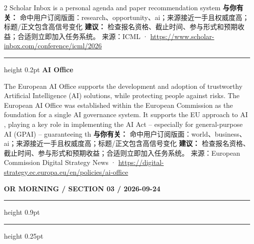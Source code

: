 \documentclass[10.5pt]{ctexart}
\begin{document}
\begin{multicols}{2}
Scholar Inbox is a personal agenda and paper recommendation system
\textbf{与你有关：} 命中用户订阅版面：research、opportunity、ai；来源接近一手且权威度高；标题/正文包含高信号变化
\textbf{建议：} 检查报名资格、截止时间、参与形式和预期收益；合适则立即加入任务系统。
{\footnotesize\color{ormuted} 来源：ICML · \url{https://www.scholar-inbox.com/conference/icml/2026}}
\vspace{2mm}
\hrule height 0.2pt
\vspace{2mm}
{\large\bfseries AI Office}\par
The European AI Office supports the development and adoption of trustworthy Artificial Intelligence (AI) solutions, while protecting people against risks. The European AI Office was established within the European Commission as the foundation for a single AI governance system. It supports the EU approach to AI , playing a key role in implementing the AI Act – especially for general-purpose AI (GPAI) – guaranteeing th
\textbf{与你有关：} 命中用户订阅版面：world、business、ai；来源接近一手且权威度高；标题/正文包含高信号变化
\textbf{建议：} 检查报名资格、截止时间、参与形式和预期收益；合适则立即加入任务系统。
{\footnotesize\color{ormuted} 来源：European Commission Digital Strategy News · \url{https://digital-strategy.ec.europa.eu/en/policies/ai-office}}
\end{multicols}
\newpage
{\small\bfseries OR MORNING / SECTION 03 / 2026-09-24}
\vspace{2mm}
\hrule height 0.9pt
\vspace{1.5mm}
\hrule height 0.25pt
\vspace{4mm}
\end{document}
